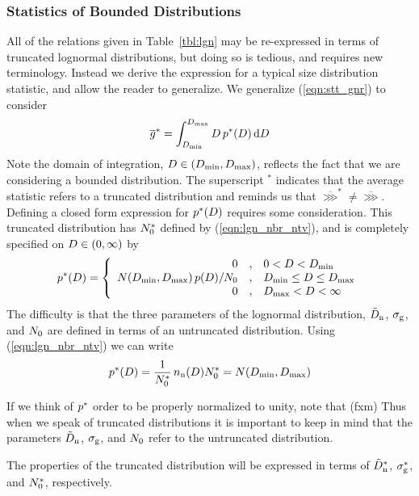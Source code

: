 \documentclass[12pt,twoside]{article}
\newcommand{\gggavg}{\overline{\ggg}}
\newcommand{\pdfdmt}{\pdffnc(\dmt)} %
\begin{document}
\subsubsection[Statistics of Bounded Distributions]{Statistics of Bounded Distributions}\label{sxn:lgn_bnd_stt}
All of the relations given in Table~\ref{tbl:lgn} may be
re-expressed in terms of truncated lognormal distributions, but doing
so is tedious, and requires new terminology.
Instead we derive the expression for a typical size distribution
statistic, and allow the reader to generalize.
We generalize (\ref{eqn:stt_gnr}) to consider
\begin{equation}
\gggavg^* = \int_{\dmtmin}^{\dmtmax}  \dmt \, \pdffnc^*(\dmt) \,
\dfr\dmt
\end{equation}
Note the domain of integration, $D \in (D_{\mathrm{min}}, D_{\mathrm{max}})$,
reflects the fact that we are considering a bounded distribution.
The superscript $^{*}$ indicates that the average statistic refers
to a truncated distribution and reminds us that $\gggavg^{*} \ne
\gggavg$. 
Defining a closed form expression for $p^{*} (D)$ requires some
consideration.  
This truncated distribution has $N_{0}^{*}$ defined by
(\ref{eqn:lgn_nbr_ntv}), and is completely specified on $D \in
(0,\infty)$ by
\begin{equation}
\pdffnc^{*} (\dmt) = \left\{
\begin{array}
{r@{\quad,\quad}l}
0 & 0 < \dmt < \dmtmin \\
\cncfnc(\dmtmin, \dmtmax) \, \pdfdmt / \cncttl & \dmtmin \le \dmt \le \dmtmax \\
0 & \dmtmax < \dmt < \infty
\end{array}
\right.
\end{equation}
The difficulty is that the three parameters of the lognormal
distribution, $\tilde{D}_{\mathrm{n}}$, $\sigma_{\mathrm{g}}$, and $N_{0}$ are defined in terms of 
an untruncated distribution.
Using (\ref{eqn:lgn_nbr_ntv}) we can write
\begin{equation}
p^{*} (D) = \frac{1}{N_{0}^{*}} \, n_{\mathrm{n}}(D)
N_{0}^{*} = N(D_{\mathrm{min}}, D_{\mathrm{max}})
\end{equation}

If we think of $p^{*}$ order to be properly normalized to unity,
note that  (fxm) %
Thus when we speak of truncated distributions it is important to keep
in mind that the parameters $\tilde{D}_{\mathrm{n}}$, $\sigma_{\mathrm{g}}$, and $N_{0}$ refer to
the untruncated distribution. 

The properties of the truncated distribution will be expressed in
terms of $\tilde{D}_{\mathrm{n}}^{*}$, $\sigma_{\mathrm{g}}^{*}$, and $N_{0}^{*}$, respectively.
\end{document}
